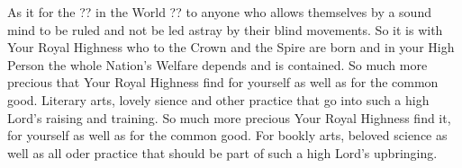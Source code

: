 
\newpage




As it for the ?? in the World ?? to anyone who allows themselves by a
sound mind to be ruled and not be led astray by their blind
movements. So it is with Your Royal Highness who to the Crown and the
Spire are born and in your High Person the whole Nation's Welfare
depends and is contained. So much more precious that Your Royal
Highness find for yourself as well as for the common good. Literary
arts, lovely sience and other practice that go into such a high Lord's 
raising and training. So much more precious Your Royal Highness find
it,  for yourself as well as for the common good. For bookly arts,
beloved science as well as all oder practice that should be part of
such a high Lord's upbringing.